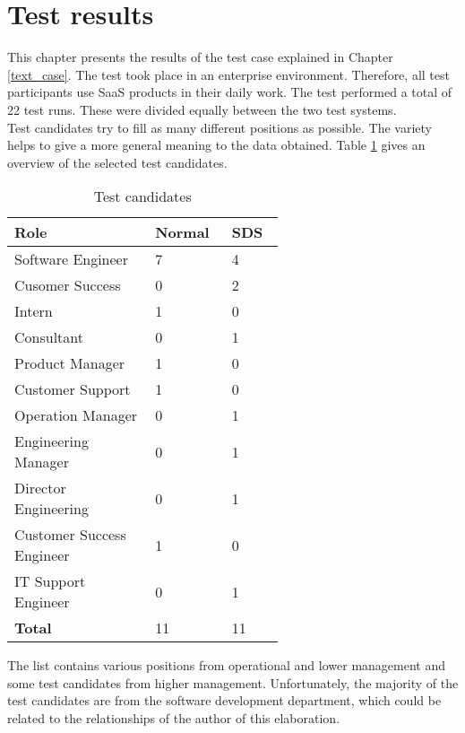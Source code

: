 \newpage
\section{Test results}\label{test_results}
This chapter presents the results of the test case explained in Chapter \ref{text_case}. The test took place in an enterprise environment. Therefore, all test participants use \ac{SaaS} products in their daily work. The test performed a total of 22 test runs. These were divided equally between the two test systems. \\
Test candidates try to fill as many different positions as possible. The variety helps to give a more general meaning to the data obtained. Table \ref{tab:test_candidates} gives an overview of the selected test candidates. \\
\begin{table}[ht]
    \centering
    \begin{tabular}{|p{0.4\linewidth} | p{0.1\linewidth}|p{0.1\linewidth}|}
        \hline
        \textbf{Role} &\textbf{Normal}&\textbf{\ac{SDS}} \\ \hline
        Software Engineer & 7 & 4 \\ \hline
        Cusomer Success & 0 & 2 \\ \hline
        Intern & 1 & 0 \\ \hline
        Consultant & 0 & 1 \\ \hline
        Product Manager & 1 & 0 \\ \hline
        Customer Support & 1 & 0 \\ \hline
        Operation Manager & 0 & 1 \\ \hline
        Engineering Manager & 0 & 1 \\ \hline
        Director Engineering & 0 & 1 \\ \hline
        Customer Success Engineer & 1 & 0 \\ \hline
        IT Support Engineer & 0 & 1 \\ \hline \hline
        \textbf{Total} & 11 & 11 \\ \hline
    \end{tabular}
    \caption{\label{tab:test_candidates} Test candidates}
\end{table}

The list contains various positions from operational and lower management and some test candidates from higher management. Unfortunately, the majority of the test candidates are from the software development department, which could be related to the relationships of the author of this elaboration. \\



% 
